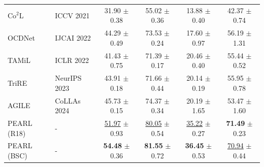 \documentclass[10pt]{article} %
\begin{document}
\begin{table}[t]
{\begin{tabular}{l|l|cc|cc}
    Co$^{2}$L \citep{cha2021co2l} & ICCV 2021   &  31.90 $\pm$0.38 & 55.02 $\pm$0.36 & 13.88 $\pm$0.40 & 42.37 $\pm$0.74 \\
    OCDNet \citep{li2022learning} & IJCAI 2022   &  44.29 $\pm$0.49 & 73.53 $\pm$0.24 & 17.60 $\pm$0.97 & 	56.19 $\pm$1.31 \\
    TAMiL \citep{bhat2022task}& ICLR 2022   & 	41.43 $\pm$0.75  & 71.39 $\pm$0.17 & 20.46 $\pm$0.40 & 55.44 $\pm$0.52  \\
    TriRE \citep{vijayan2023trire} & NeurIPS 2023  & 43.91 $\pm$0.18 & 71.66 $\pm$ 0.44 & 20.14 $\pm$0.19 & 55.95 $\pm$0.78 \\  
    AGILE \citep{bhat2024mitigating} & CoLLAs 2024 & 45.73 $\pm$0.15  & 74.37 $\pm$0.34 & 20.19 $\pm$1.65 & 53.47 $\pm$1.60 \\
    \midrule 
    PEARL (R18) & -  & \underline{51.97}	$\pm$ 0.93   &  \underline{80.05} $\pm$	0.54  &  \underline{35.22} $\pm$ 0.27 &  \textbf{71.49} $\pm$ 0.23  \\

     PEARL (BSC) & -   & \textbf{54.48} $\pm$	0.36 & \textbf{81.55} $\pm$ 0.72 & \textbf{36.45}   $\pm$ 0.53   & \underline{70.94} $\pm$ 0.44   \\

 \bottomrule
\end{tabular}
}
\end{table}
\end{document}
